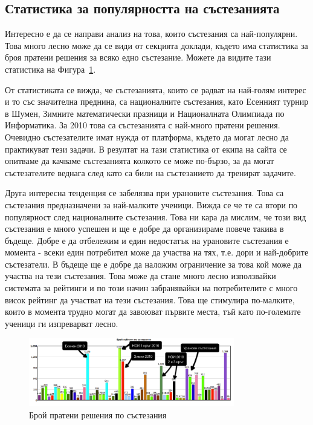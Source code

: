 \documentclass[a4paper,12pt]{article}
\begin{document}
  \subsection{Статистика за популярността на състезанията}
  
  Интересно е да се направи анализ на това, които състезания са най-популярни. Това много лесно може да се види от секцията доклади, където има статистика за броя пратени решения за всяко едно състезание. Можете да видите тази статистика на Фигура~\ref{contest_submits}.
  
  От статистиката се вижда, че състезанията, които се радват на най-голям интерес и то със значителна преднина, са националните състезания, като Есенният турнир в Шумен, Зимните математически празници и Националната Олимпиада по Информатика. За 2010 това са състезанията с най-много пратени решения. Очевидно състезателите имат нужда от платформа, където да могат лесно да практикуват тези задачи. В резултат на тази статистика от екипа на сайта се опитваме да качваме състезанията колкото се може по-бързо, за да могат състезателите веднага след като са били на състезанието да тренират задачите.
  
  Друга интересна тенденция се забелязва при урановите състезания. Това са състезания предназначени за най-малките ученици. Вижда се че те са втори по популярност след националните състезания. Това ни кара да мислим, че този вид състезания е много успешен и ще е добре да организираме повече такива в бъдеще. Добре е да отбележим и един недостатък на урановите състезания е момента - всеки един потребител може да участва на тях, т.е. дори и най-добрите състезатели. В бъдеще ще е добре да наложим ограничение за това кой може да участва на тези състезания. Това може да стане много лесно използвайки системата за рейтинги и по този начин забранявайки на потребителите с много висок рейтинг да участват на тези състезания. Това ще стимулира по-малките, които в момента трудно могат да завоюват първите места, тъй като по-големите ученици ги изпреварват лесно.
  
  \begin{figure}
    \begin{center}
      \includegraphics[width=0.8\textwidth]{images/contest_submits.png}
    \end{center}
    \caption{Брой пратени решения по състезания}
    \label{contest_submits}
  \end{figure}
\end{document}
